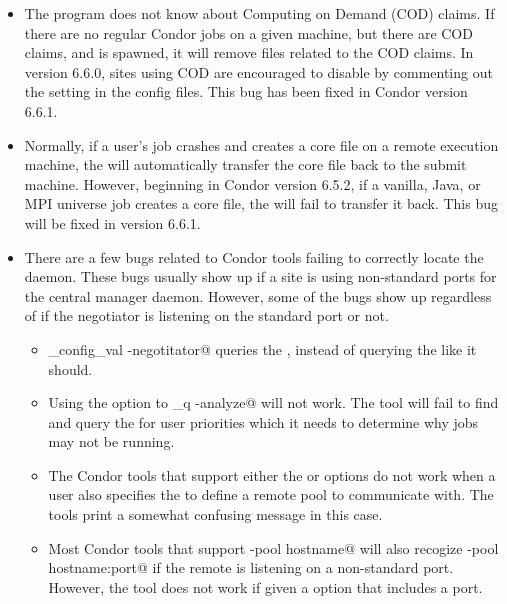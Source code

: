 \begin{itemize}

\item The  program does not know about Computing on
  Demand (COD) claims.
  If there are no regular Condor jobs on a given machine, but there
  are COD claims, and  is spawned, it will remove files
  related to the COD claims.
  In version 6.6.0, sites using COD are encouraged to disable
   by commenting out the  setting in the
  config files.
  This bug has been fixed in Condor version 6.6.1.

\item Normally, if a user's job crashes and creates a core file on a
  remote execution machine, the  will automatically
  transfer the core file back to the submit machine.
  However, beginning in Condor version 6.5.2, if a vanilla, Java, or
  MPI universe job creates a core file, the  will fail
  to transfer it back.
  This bug will be fixed in version 6.6.1.
  
\item There are a few bugs related to Condor tools failing to
  correctly locate the  daemon.
  These bugs usually show up if a site is using non-standard ports for
  the central manager daemon.
  However, some of the bugs show up regardless of if the negotiator is
  listening on the standard port or not. 

  \begin{itemize}
    \item \verb@condor_config_val -negotitator@ queries the
          , instead of querying the
           like it should.  

    \item Using the  option to \verb@condor_q -analyze@
          will not work.
          The tool will fail to find and query the 
          for user priorities which it needs to determine why jobs may
          not be running.

    \item The Condor tools that support either the 
          or  options do not work when a user also
          specifies the  to define a remote pool to
          communicate with.
          The tools print a somewhat confusing message in this case.

    \item Most Condor tools that support \verb@-pool hostname@ will
          also recogize \verb@-pool hostname:port@ if the remote
           is listening on a non-standard port.
          However, the  tool does not work if given a
           option that includes a port.

  \end{itemize}

\end{itemize}

